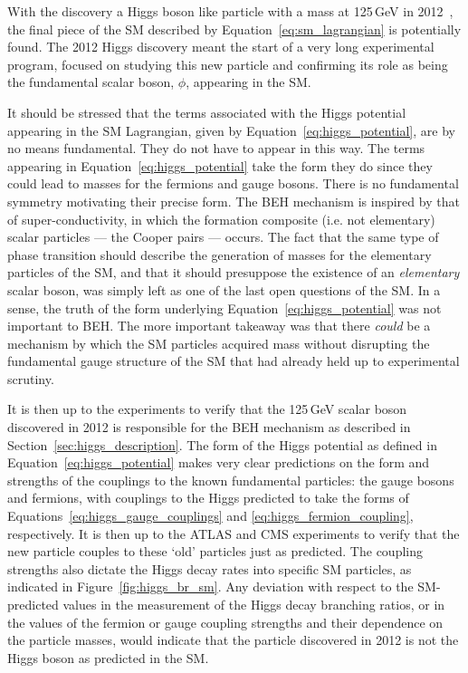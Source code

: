 With the discovery a Higgs boson like particle with a mass at 125\,GeV in 2012~\cite{HDiscoveryATLAS,HDiscoveryCMS},
the final piece of the SM described by Equation~\ref{eq:sm_lagrangian} is potentially found.
The 2012 Higgs discovery meant the start of a very long experimental program, focused
on studying this new particle and confirming its role as being the fundamental scalar boson, $\phi$,
appearing in the SM.

It should be stressed that the terms associated with the Higgs potential appearing in the SM
Lagrangian, given by Equation~\ref{eq:higgs_potential}, are by no means fundamental.
They do not have to appear in this way.
The terms appearing in Equation~\ref{eq:higgs_potential} take the form they do since they
could lead to masses for the fermions and gauge bosons.
There is no fundamental symmetry motivating their precise form.
The BEH mechanism is inspired by that of super-conductivity, in which the formation composite (i.e. not elementary)
scalar particles --- the Cooper pairs --- occurs.
The fact that the same type of phase transition should describe the generation of masses for
the elementary particles of the SM, and that it should presuppose the existence of an \textit{elementary}
scalar boson, was simply left as one of the last open questions of the SM.
In a sense, the truth of the form underlying Equation~\ref{eq:higgs_potential} was not important to BEH.
The more important takeaway was that there \textit{could} be a mechanism by which the SM particles acquired
mass without disrupting the fundamental gauge structure of the SM that had already held up to experimental scrutiny.

It is then up to the experiments to verify that the 125\,GeV scalar boson discovered in 2012
is responsible for the BEH mechanism as described in Section~\ref{sec:higgs_description}.
The form of the Higgs potential as defined in Equation~\ref{eq:higgs_potential} makes
very clear predictions on the form and strengths of the couplings to the known fundamental particles:
the gauge bosons and fermions, with couplings to the Higgs predicted to take the forms
of Equations~\ref{eq:higgs_gauge_couplings} and \ref{eq:higgs_fermion_coupling}, respectively.
It is then up to the ATLAS and CMS experiments to verify that the new particle couples
to these `old' particles just as predicted.
The coupling strengths also dictate the Higgs decay rates into specific SM particles, as indicated
in Figure~\ref{fig:higgs_br_sm}.
Any deviation with respect to the SM-predicted values in the measurement of the Higgs decay branching ratios, or
in the values of the fermion or gauge coupling strengths and their dependence on the
particle masses, would indicate that the particle discovered in 2012 is not the Higgs boson as predicted
in the SM.


